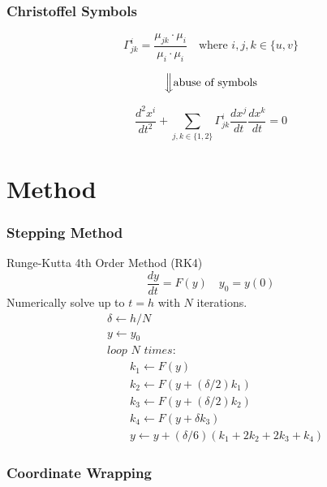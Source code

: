 \documentclass{beamer}
\begin{document}
\begin{frame}
	
	\frametitle{Christoffel Symbols}
	
	\begin{equation*} 
		\Gamma^i_{jk} = \frac{\mu_{jk}\cdot\mu_i}{\mu_i\cdot\mu_i} \quad\text{where } i,j,k \in \{u,v\}
	\end{equation*}
	
	$$\Big\Downarrow \text{abuse of symbols}$$
	
	\begin{equation*}
		\frac{d^2x^i}{dt^2} + \sum_{j,k \in \{1,2\}} \Gamma^i_{jk}\frac{dx^j}{dt}\frac{dx^k}{dt} = 0
	\end{equation*}
	
\end{frame}

\section{Method}

\begin{frame}

	\frametitle{Stepping Method}
	
	Runge-Kutta 4th Order Method (RK4)
	\begin{equation*}
		\frac{dy}{dt} = F(y) \quad y_0 = y(0)
	\end{equation*}
	Numerically solve up to $t=h$ with $N$ iterations.
	\begin{align*}
		& \delta \gets h/N \\
		& y \gets y_0 \\
		& \textit{loop } N \textit{ times:} \\
		& \quad\quad k_1 \gets F(y) \\
		& \quad\quad k_2 \gets F\left(y+(\delta/2)k_1\right) \\
		& \quad\quad k_3 \gets F\left(y+(\delta/2)k_2\right) \\
		& \quad\quad k_4 \gets F\left(y + \delta k_3\right) \\
		& \quad\quad y \gets y+(\delta/6)(k_1+2k_2+2k_3+k_4)
	\end{align*}

\end{frame}


\begin{frame}
	
	\frametitle{Coordinate Wrapping}
	
	
\end{frame}
\end{document}
